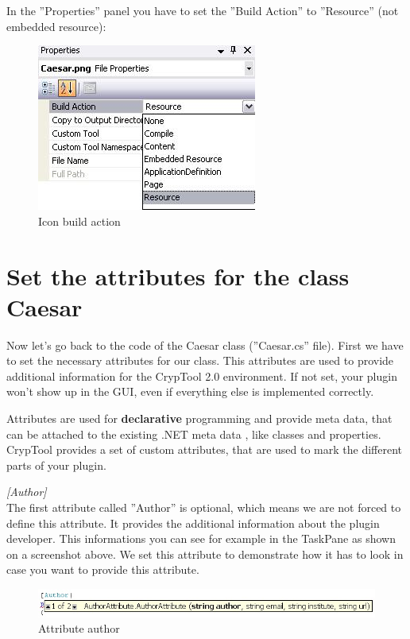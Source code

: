 In the ''Properties'' panel you have to set the ''Build Action'' to ''Resource'' (not embedded resource):
\begin{figure}[h!]
	\centering
		\includegraphics{figures/icon_build_action.jpg}
	\caption{Icon  build action}
	\label{fig:icon_build_action}
\end{figure}
\section{Set the attributes for the class Caesar}\label{sec:SetTheAttributesForTheClassCaesar}
Now let's go back to the code of the Caesar class (''Caesar.cs'' file). First we have to set the necessary attributes for our class. This attributes are used to provide additional information for the CrypTool 2.0 environment. If not set, your plugin won't show up in the GUI, even if everything else is implemented correctly.

Attributes are used for \textbf{declarative} programming and provide meta data, that can be attached to the existing .NET meta data , like classes and properties. CrypTool provides a set of custom attributes, that are used to mark the different parts of your plugin.


\textit{[Author]}\\
The first attribute called ''Author'' is optional, which means we are not forced to define this attribute. It provides the additional information about the plugin developer. This informations you can see for example in the TaskPane as shown on a screenshot above. We set this attribute to demonstrate how it has to look in case you want to provide this attribute.
\begin{figure}[h!]
	\centering
		\includegraphics[width=1.00\textwidth]{figures/attribute_author.jpg}
	\caption{Attribute author}
	\label{fig:attribute_author}
\end{figure}

